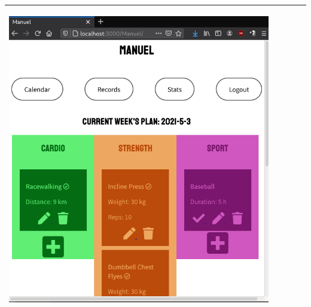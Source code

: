 \documentclass[12pt,twoside,titlepage,a4paper]{article}
\theoremstyle{definicion}
\theoremstyle{lema}
\theoremstyle{teorema}
\theoremstyle{corolario}
\theoremstyle{ejemplo}
\theoremstyle{nota}
\begin{document}
\begin{table}[!h]
\begin{tabular}{|m{0.6cm}|m{2.9cm}|m{3.6cm}|m{1.1cm}|m{5.9cm}|}
		\begin{center}\includegraphics[scale=0.22]{userpage9.png}\end{center} \\
		\hline
	\end{tabular}
\end{table}
\newpage
\end{document}
